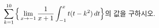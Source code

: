 $\displaystyle\sum_{k=1}^{10}\Big\{\displaystyle\lim_{x\to -1}\dfrac{1}{x+1}\displaystyle\int_{-1}^{x} t(t-k^2)\mkern3mu dt\Big\}$의 값을 구하시오.
